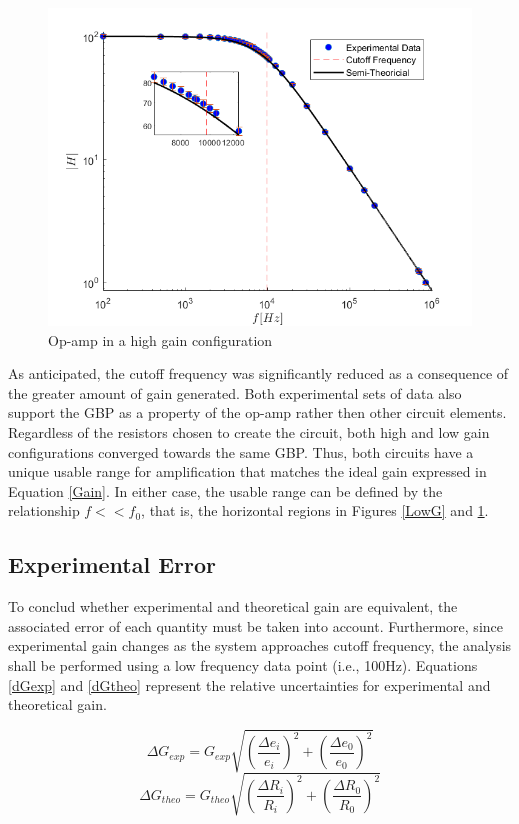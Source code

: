 \documentclass[letterpaper,12pt]{article}
\begin{document}
\begin{figure}[ht]
    \centering
    \includegraphics[scale = .6]{HighGain.png}
    \caption{Op-amp in a high gain configuration}
    \label{HighG}
\end{figure}
As anticipated, the cutoff frequency was significantly reduced as a consequence of the greater amount of gain generated. Both experimental sets of data also support the GBP as a property of the op-amp rather then other circuit elements. Regardless of the resistors chosen to create the circuit, both high and low gain configurations converged towards the same GBP. Thus, both circuits have a unique usable range for amplification that matches the ideal gain expressed in Equation \ref{Gain}. In either case, the usable range can be defined by the relationship $f<<f_0$, that is, the horizontal regions in Figures \ref{LowG} and \ref{HighG}.

\subsection{Experimental Error}
To conclud whether experimental and theoretical gain are equivalent, the associated error of each quantity must be taken into account. Furthermore, since experimental gain changes as the system approaches cutoff frequency, the analysis shall be performed using a low frequency data point (i.e., 100Hz). Equations \ref{dGexp} and \ref{dGtheo} represent the relative uncertainties for experimental and theoretical gain. 

\begin{equation}
    \Delta G_{exp} = G_{exp} \sqrt{ (\frac{\Delta e_i}{e_i})^2 + (\frac{\Delta e_0}{e_0})^2}
    \label{dGexp}
\end{equation}
\begin{equation}
    \Delta G_{theo} = G_{theo}\sqrt{(\frac{\Delta R_i}{R_i})^2 + (\frac{\Delta R_0}{R_0})^2 }
    \label{dGtheo}
\end{equation}
\end{document}
